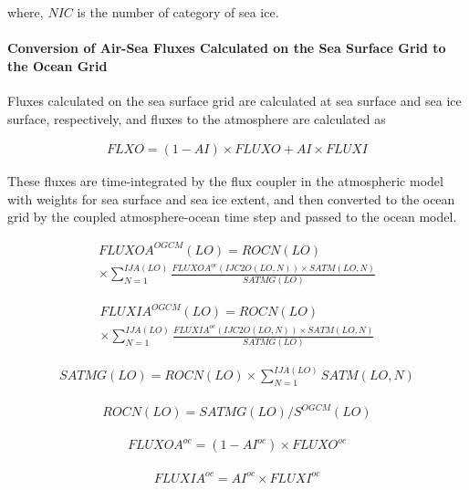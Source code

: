 where, \(NIC\) is the number of category of sea ice.

\hypertarget{conversion-of-air-sea-fluxes-calculated-on-the-sea-surface-grid-to-the-ocean-grid}{%
\paragraph{Conversion of Air-Sea Fluxes Calculated on the Sea Surface
Grid to the Ocean
Grid}\label{conversion-of-air-sea-fluxes-calculated-on-the-sea-surface-grid-to-the-ocean-grid}}

Fluxes calculated on the sea surface grid are calculated at sea surface
and sea ice surface, respectively, and fluxes to the atmosphere are
calculated as

\begin{eqnarray} FLXO=(1-AI) \times FLUXO+AI \times FLUXI \end{eqnarray}

These fluxes are time-integrated by the flux coupler in the atmospheric
model with weights for sea surface and sea ice extent, and then
converted to the ocean grid by the coupled atmosphere-ocean time step
and passed to the ocean model.

\begin{eqnarray} FLUXOA^{OGCM}(LO) = ROCN(LO) \\ \times \sum_{N=1}^{IJA(LO)} \frac{FLUXOA^{oc}(IJC2O(LO,N)) \times SATM(LO,N)}{SATMG(LO)} \end{eqnarray}

\begin{eqnarray} FLUXIA^{OGCM}(LO) = ROCN(LO) \\ \times \sum_{N=1}^{IJA(LO)} \frac{FLUXIA^{oc}(IJC2O(LO,N)) \times SATM(LO,N)}{SATMG(LO)} \end{eqnarray}

\begin{eqnarray} SATMG(LO)=ROCN(LO) \times \sum_{N=1}^{IJA(LO)} SATM(LO,N) \end{eqnarray}

\begin{eqnarray} ROCN(LO)=SATMG(LO)/S^{OGCM}(LO) \end{eqnarray}

\begin{eqnarray} FLUXOA^{oc}=(1-AI^{oc}) \times FLUXO^{oc} \end{eqnarray}

\begin{eqnarray} FLUXIA^{oc}=AI^{oc} \times FLUXI^{oc} \end{eqnarray}

